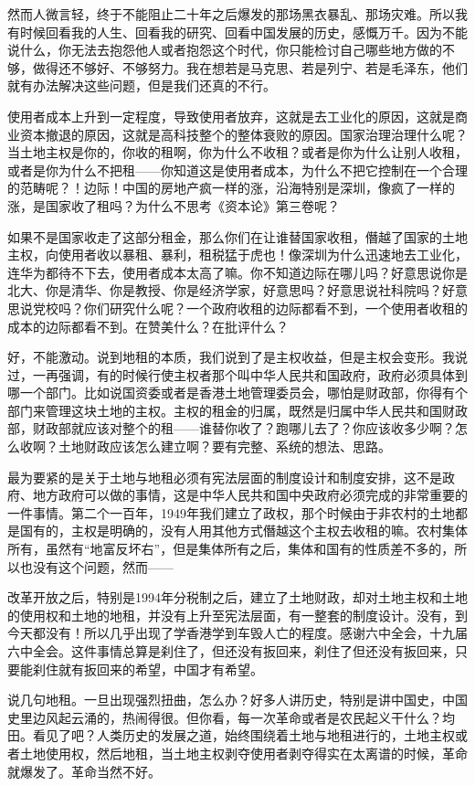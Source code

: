 \documentclass[UTF8, 12pt, a4paper]{ctexrep}
\begin{document}
然而人微言轻，终于不能阻止二十年之后爆发的那场黑衣暴乱、那场灾难。所以我有时候回看我的人生、回看我的研究、回看中国发展的历史，感慨万千。因为不能说什么，你无法去抱怨他人或者抱怨这个时代，你只能检讨自己哪些地方做的不够，做得还不够好、不够努力。我在想若是马克思、若是列宁、若是毛泽东，他们就有办法解决这些问题，但是我们还真的不行。

使用者成本上升到一定程度，导致使用者放弃，这就是去工业化的原因，这就是商业资本撤退的原因，这就是高科技整个的整体衰败的原因。国家治理治理什么呢？当土地主权是你的，你收的租啊，你为什么不收租？或者是你为什么让别人收租，或者是你为什么不把租——你知道这是使用者成本，为什么不把它控制在一个合理的范畴呢？！边际！中国的房地产疯一样的涨，沿海特别是深圳，像疯了一样的涨，是国家收了租吗？为什么不思考《资本论》第三卷呢？

如果不是国家收走了这部分租金，那么你们在让谁替国家收租，僭越了国家的土地主权，向使用者收以暴租、暴利，租税猛于虎也！像深圳为什么迅速地去工业化，连华为都待不下去，使用者成本太高了嘛。你不知道边际在哪儿吗？好意思说你是北大、你是清华、你是教授、你是经济学家，好意思吗？好意思说社科院吗？好意思说党校吗？你们研究什么呢？一个政府收租的边际都看不到，一个使用者收租的成本的边际都看不到。在赞美什么？在批评什么？

好，不能激动。说到地租的本质，我们说到了是主权收益，但是主权会变形。我说过，一再强调，有的时候行使主权者那个叫中华人民共和国政府，政府必须具体到哪一个部门。比如说国资委或者是香港土地管理委员会，哪怕是财政部，你得有个部门来管理这块土地的主权。主权的租金的归属，既然是归属中华人民共和国财政部，财政部就应该对整个的租——谁替你收了？跑哪儿去了？你应该收多少啊？怎么收啊？土地财政应该怎么建立啊？要有完整、系统的想法、思路。

最为要紧的是关于土地与地租必须有宪法层面的制度设计和制度安排，这不是政府、地方政府可以做的事情，这是中华人民共和国中央政府必须完成的非常重要的一件事情。第二个一百年，1949年我们建立了政权，那个时候由于非农村的土地都是国有的，主权是明确的，没有人用其他方式僭越这个主权去收租的嘛。农村集体所有，虽然有“地富反坏右”，但是集体所有之后，集体和国有的性质差不多的，所以也没有这个问题，然而——

改革开放之后，特别是1994年分税制之后，建立了土地财政，却对土地主权和土地的使用权和土地的地租，并没有上升至宪法层面，有一整套的制度设计。没有，到今天都没有！所以几乎出现了学香港学到车毁人亡的程度。感谢六中全会，十九届六中全会。这件事情总算是刹住了，但还没有扳回来，刹住了但还没有扳回来，只要能刹住就有扳回来的希望，中国才有希望。

说几句地租。一旦出现强烈扭曲，怎么办？好多人讲历史，特别是讲中国史，中国史里边风起云涌的，热闹得很。但你看，每一次革命或者是农民起义干什么？均田。看见了吧？人类历史的发展之道，始终围绕着土地与地租进行的，土地主权或者土地使用权，然后地租，当土地主权剥夺使用者剥夺得实在太离谱的时候，革命就爆发了。革命当然不好。
\end{document}
